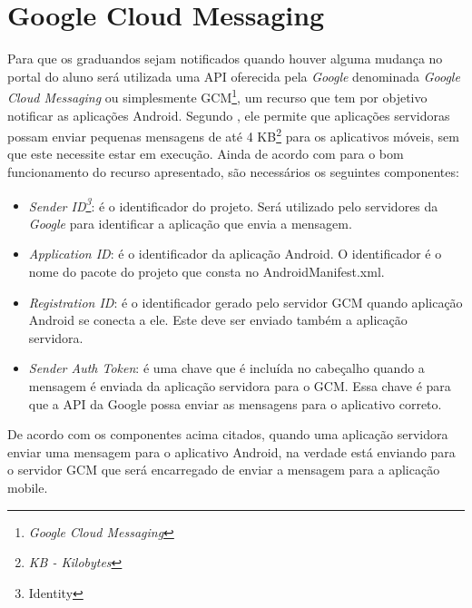 \section{\textbf{Google Cloud 	Messaging}}

	\par Para que os graduandos sejam notificados quando houver alguma mudança no
portal do aluno será utilizada uma API oferecida pela \textit{Google}
denominada \textit{Google Cloud Messaging} ou simplesmente
GCM\footnote{\textit{Google Cloud Messaging}}, um recurso que tem por objetivo
notificar as aplicações Android. Segundo , ele permite que
aplicações servidoras possam enviar pequenas mensagens de até 4
KB\footnote{\textit{KB - Kilobytes}} para os aplicativos móveis, sem que este
necessite estar em execução. Ainda de acordo com  para o
bom funcionamento do recurso apresentado, são necessários os seguintes componentes:

\begin{itemize}
	
	\item \textit{Sender ID\footnote{Identity}}: é o identificador do projeto.
	Será utilizado pelo servidores da \textit{Google} para identificar a aplicação
	que envia a mensagem.
	
	\item \textit{Application ID}: é o identificador da aplicação Android. O
	identificador é o nome do pacote do projeto que consta no AndroidManifest.xml.
	
	\item \textit{Registration ID}: é o identificador gerado pelo servidor GCM
	quando aplicação Android se conecta a ele. Este deve ser enviado também a
	aplicação servidora.
	
	\item \textit{Sender Auth Token}: é uma chave que é incluída no cabeçalho
	quando a mensagem é enviada da aplicação servidora para o GCM. Essa chave é
	para que a API da Google possa enviar as mensagens para o aplicativo correto.

\end{itemize}

	\par De acordo com os componentes acima citados, quando uma aplicação servidora
enviar uma mensagem para o aplicativo Android, na verdade está enviando para o
servidor GCM que será encarregado de enviar a mensagem para a aplicação mobile.